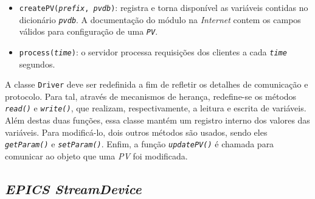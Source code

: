 \begin{itemize}
  \renewcommand\labelitemi{--}
  \item \texttt{createPV(\textit{prefix}, \textit{pvdb})}: registra e torna
  disponível as variáveis contidas no dicionário \texttt{\textit{pvdb}}. A
  documentação do módulo na \textit{Internet} contem os campos válidos para
  configuração de uma \texttt{\textit{PV}}.

  \item \texttt{process(\textit{time})}: o servidor processa requisições dos
  clientes a cada \texttt{\textit{time}} segundos.
\end{itemize}

A classe \texttt{Driver} deve ser redefinida a fim de refletir os detalhes de
comunicação e protocolo.  Para tal, através de mecanismos de herança,
redefine-se os métodos \texttt{\textit{read()}} e \texttt{\textit{write()}}, que
realizam, respectivamente, a leitura e escrita de variáveis. Além destas duas
funções, essa classe mantém um registro interno dos valores das variáveis. Para
modificá-lo, dois outros métodos são usados, sendo eles
\texttt{\textit{getParam()}} e \texttt{\textit{setParam()}}. Enfim, a função
\texttt{\textit{updatePV()}} é chamada para comunicar ao objeto
 que uma \textit{PV} foi modificada.

\subsection{\textit{EPICS StreamDevice}}



 